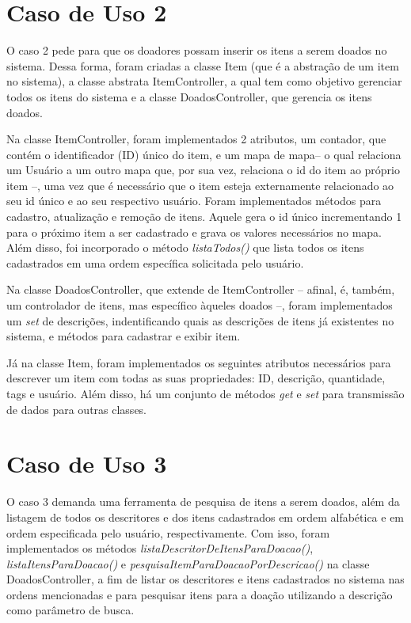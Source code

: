 \documentclass[journal,12pt,onecolumn,draftclsnofoot,]{article}
\begin{document}
	\section{Caso de Uso 2}
	O caso 2 pede para que os doadores possam inserir os itens a serem doados no sistema. Dessa forma, foram criadas a classe Item (que é a abstração de um item no sistema), a classe abstrata ItemController, a qual tem como objetivo gerenciar todos os itens do sistema e a classe DoadosController, que gerencia os itens doados.
	
	Na classe ItemController, foram implementados 2 atributos, um contador, que contém o identificador (ID) único do item, e um mapa de mapa-- o qual relaciona um Usuário a um outro mapa que, por sua vez, relaciona o id do item ao próprio item --, uma vez que é necessário que o item esteja externamente relacionado ao seu id único e ao seu respectivo usuário. Foram implementados métodos para cadastro, atualização e remoção de itens. Aquele gera o id único incrementando 1 para o próximo item a ser cadastrado e grava os valores necessários no mapa. Além disso, foi incorporado o método \textit{listaTodos()} que lista todos os itens cadastrados em uma ordem específica solicitada pelo usuário. 

	Na classe DoadosController, que extende de ItemController -- afinal, é, também, um controlador de itens, mas específico àqueles doados --, foram implementados um \textit{set} de descrições, indentificando quais as descrições de itens já existentes no sistema, e métodos para cadastrar e exibir item.

	Já na classe Item, foram implementados os seguintes atributos necessários para descrever um item com todas as suas propriedades: ID, descrição, quantidade, tags e usuário. Além disso, há um conjunto de métodos \textit{get} e \textit{set} para transmissão de dados para outras classes.
	
	
	\section{Caso de Uso 3}
	O caso 3 demanda uma ferramenta de pesquisa de itens a serem doados, além da listagem de todos os descritores e dos itens cadastrados em ordem alfabética e em ordem especificada pelo usuário, respectivamente. Com isso, foram implementados os métodos \textit{listaDescritorDeItensParaDoacao()}, \textit{listaItensParaDoacao()} e \textit{pesquisaItemParaDoacaoPorDescricao()} na classe DoadosController, a fim de listar os descritores e itens cadastrados no sistema nas ordens mencionadas e para pesquisar itens para a doação utilizando a descrição como parâmetro de busca.
	
	
\end{document}
